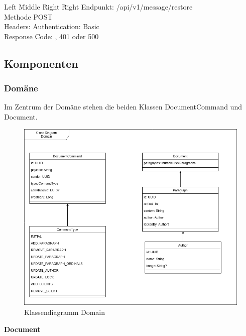 \begin{tabbing}
    Left \= Middle \= Right \= Right \kill
    Endpunkt:  \> \> \> /api/v1/message/restore\\
    Methode \>  \> \> POST\\
    Headers:  \> \>   \> Authentication: Basic\\
    Response Code:  \> \>  , 401 oder 500 \\
\end{tabbing}

\clearpage

\subsection{Komponenten}

\subsubsection{Domäne}

Im Zentrum der Domäne stehen die beiden Klassen DocumentCommand und Document.

\begin{figure}[h]
    \centering
    \begin{minipage}[b]{0.8\textwidth}
        \includegraphics[width=\textwidth]{graphics/class-be-domain.drawio}
        \caption{Klassendiagramm Domain}
    \end{minipage}
\end{figure}

\textbf{Document}


